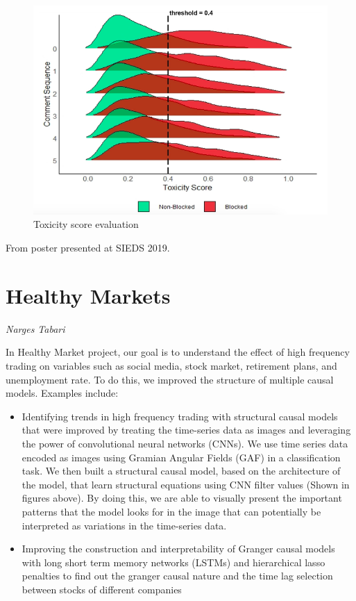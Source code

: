 \begin{figure}[!hbtp]
\includegraphics[width=\textwidth]{images/wiki2}
\caption{Toxicity score evaluation}
\end{figure}

From poster presented at SIEDS 2019.

\pagebreak
\section{Healthy Markets}
\label{sec:hmt}

\emph{Narges Tabari}
\bigskip

In Healthy Market project, our goal is to understand the effect of high frequency trading on variables such as social media, stock market, retirement plans, and unemployment rate. To do this, we improved the structure of multiple causal models. Examples include: 
\begin{itemize}
\item Identifying trends in high frequency trading with structural causal models that were improved by treating the time-series data as images and leveraging the power of convolutional neural networks (CNNs). We use time series data encoded as images using Gramian Angular Fields (GAF) in a classification task. We then built a structural causal model, based on the architecture of the model, that learn structural equations using CNN filter values (Shown in figures above). By doing this, we are able to visually present the important patterns that the model looks for in the image that can potentially be interpreted as variations in the time-series data.
\item Improving the construction and interpretability of Granger causal models with long short term memory networks (LSTMs) and hierarchical lasso penalties to find out the granger causal nature and the time lag selection between stocks of different companies 
\end{itemize}

